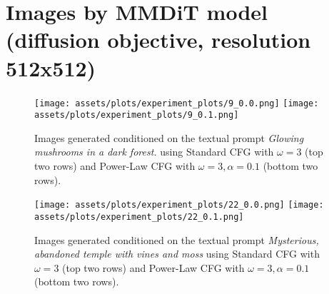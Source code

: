 \begin{minipage}{\textwidth}
\section{Images by MMDiT model (diffusion objective, resolution 512x512)}
\label{appx:ex_by_tti}
\begin{figure}[H]
    \centering
    \begin{minipage}{0.9\linewidth}
        \centering
        \texttt{[image: assets/plots/experiment\_plots/9\_0.0.png]}
        \texttt{[image: assets/plots/experiment\_plots/9\_0.1.png]} 
    \vspace{-.25cm}
        \caption{Images generated conditioned on the textual prompt \textit{Glowing mushrooms in a dark forest.} using Standard CFG with $\omega=3$ (top two rows) and Power-Law CFG with $\omega=3, \alpha=0.1$ (bottom two rows).}
        \vspace{0.5cm}
    \end{minipage}
    
    
    \begin{minipage}{.9\linewidth}
        \centering
        \texttt{[image: assets/plots/experiment\_plots/22\_0.0.png]}
        \texttt{[image: assets/plots/experiment\_plots/22\_0.1.png]} 
        \vspace{-.25cm}
        \caption{Images generated conditioned on the textual prompt \textit{Mysterious, abandoned temple with vines and moss} using Standard CFG with $\omega=3$ (top two rows) and Power-Law CFG with $\omega=3, \alpha=0.1$ (bottom two rows).}
        \vspace{0.5cm}
    \end{minipage}
\end{figure}
\end{minipage}



